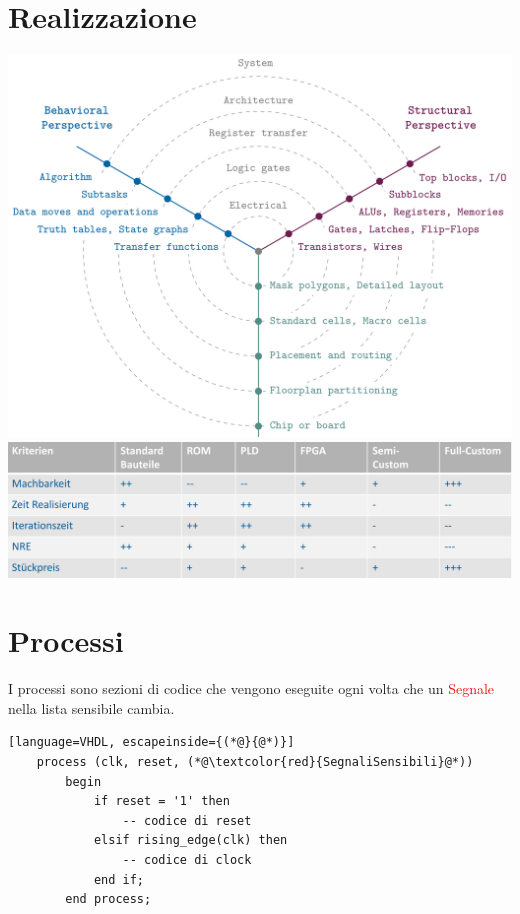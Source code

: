 \section{Realizzazione}
    \includegraphics[width=0.5\columnwidth]{Images/Development model.png}
    \includegraphics[width=0.5\columnwidth]{Images/Whal der realisirungsform.png}

\section{Processi}
    I processi sono sezioni di codice che vengono eseguite ogni volta che un \textcolor{red}{Segnale} nella lista sensibile cambia.
    \begin{lstlisting}[language=VHDL, escapeinside={(*@}{@*)}]
    process (clk, reset, (*@\textcolor{red}{SegnaliSensibili}@*)) 
        begin
            if reset = '1' then
                -- codice di reset
            elsif rising_edge(clk) then
                -- codice di clock
            end if;
        end process;
    \end{lstlisting}